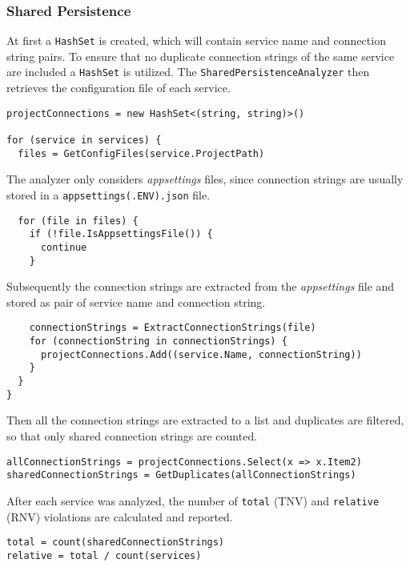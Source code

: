 \documentclass{article}
\begin{document}
\subsubsection{Shared Persistence}
At first a \lstinline{HashSet} is created, which will contain service name and connection string pairs. To ensure that no duplicate connection strings of the same service are included a \lstinline{HashSet} is utilized. The \lstinline{SharedPersistenceAnalyzer} then retrieves the configuration file of each service.
\begin{lstlisting}
projectConnections = new HashSet<(string, string)>()

for (service in services) {
  files = GetConfigFiles(service.ProjectPath)
\end{lstlisting}
The analyzer only considers \textit{appsettings} files, since connection strings are usually stored in a \lstinline{appsettings(.ENV).json} file.
\begin{lstlisting}
  for (file in files) {
    if (!file.IsAppsettingsFile()) {
      continue
    }
\end{lstlisting}
Subsequently the connection strings are extracted from the \textit{appsettings} file and stored as pair of service name and connection string.
\begin{lstlisting}
    connectionStrings = ExtractConnectionStrings(file)
    for (connectionString in connectionStrings) {
      projectConnections.Add((service.Name, connectionString))
    }
  }
}
\end{lstlisting}
Then all the connection strings are extracted to a list and duplicates are filtered, so that only shared connection strings are counted.
\begin{lstlisting}
allConnectionStrings = projectConnections.Select(x => x.Item2)
sharedConnectionStrings = GetDuplicates(allConnectionStrings)
\end{lstlisting}
After each service was analyzed, the number of \lstinline{total} (TNV) and \lstinline{relative} (RNV) violations are calculated and reported.
\begin{lstlisting}
total = count(sharedConnectionStrings)
relative = total / count(services)
\end{lstlisting}
\end{document}
